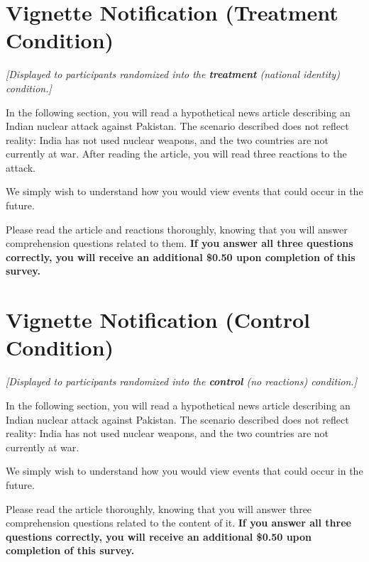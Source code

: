 \documentclass[12pt]{article}
\begin{document}
\section{Vignette Notification (Treatment Condition)}
\label{sec:notif-treatment}

\noindent\textit{[Displayed to participants randomized into the \textbf{treatment} (national identity) condition.]}

\bigskip

\noindent In the following section, you will read a hypothetical news article describing an Indian nuclear attack against Pakistan. The scenario described does not reflect reality: India has not used nuclear weapons, and the two countries are not currently at war. After reading the article, you will read three reactions to the attack.

We simply wish to understand how you would view events that could occur in the future.

Please read the article and reactions thoroughly, knowing that you will answer comprehension questions related to them. \textbf{If you answer all three questions correctly, you will receive an additional \$0.50 upon completion of this survey.}

\section{Vignette Notification (Control Condition)}
\label{sec:notif-control}
 
\noindent\textit{[Displayed to participants randomized into the \textbf{control} (no reactions) condition.]}
 
\bigskip
 
\noindent In the following section, you will read a hypothetical news article describing an Indian nuclear attack against Pakistan. The scenario described does not reflect reality: India has not used nuclear weapons, and the two countries are not currently at war.
 
We simply wish to understand how you would view events that could occur in the future.
 
Please read the article thoroughly, knowing that you will answer three comprehension questions related to the content of it. \textbf{If you answer all three questions correctly, you will receive an additional \$0.50 upon completion of this survey.}
\end{document}
